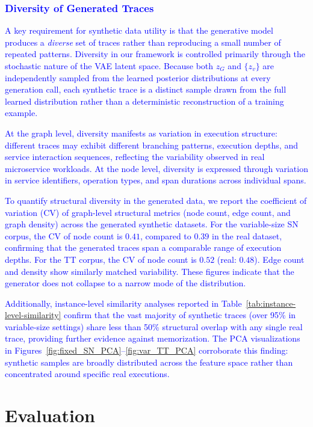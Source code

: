 \documentclass[sigconf,review]{acmart}
\begin{document}
\textcolor{blue}{\subsubsection{Diversity of Generated Traces}
A key requirement for synthetic data utility is that the generative model produces a \emph{diverse} set of traces rather than reproducing a small number of repeated patterns. Diversity in our framework is controlled primarily through the stochastic nature of the VAE latent space. Because both $z_G$ and $\{z_v\}$ are independently sampled from the learned posterior distributions at every generation call, each synthetic trace is a distinct sample drawn from the full learned distribution rather than a deterministic reconstruction of a training example.

At the graph level, diversity manifests as variation in execution structure: different traces may exhibit different branching patterns, execution depths, and service interaction sequences, reflecting the variability observed in real microservice workloads. At the node level, diversity is expressed through variation in service identifiers, operation types, and span durations across individual spans.

To quantify structural diversity in the generated data, we report the coefficient of variation (CV) of graph-level structural metrics (node count, edge count, and graph density) across the generated synthetic datasets. For the variable-size SN corpus, the CV of node count is $0.41$, compared to $0.39$ in the real dataset, confirming that the generated traces span a comparable range of execution depths. For the TT corpus, the CV of node count is $0.52$ (real: $0.48$). Edge count and density show similarly matched variability. These figures indicate that the generator does not collapse to a narrow mode of the distribution.

Additionally, instance-level similarity analyses reported in Table~\ref{tab:instance-level-similarity} confirm that the vast majority of synthetic traces (over 95\% in variable-size settings) share less than 50\% structural overlap with any single real trace, providing further evidence against memorization. The PCA visualizations in Figures~\ref{fig:fixed_SN_PCA}--\ref{fig:var_TT_PCA} corroborate this finding: synthetic samples are broadly distributed across the feature space rather than concentrated around specific real executions.}



\section{Evaluation}
\label{sec:evaluation}
\end{document}
